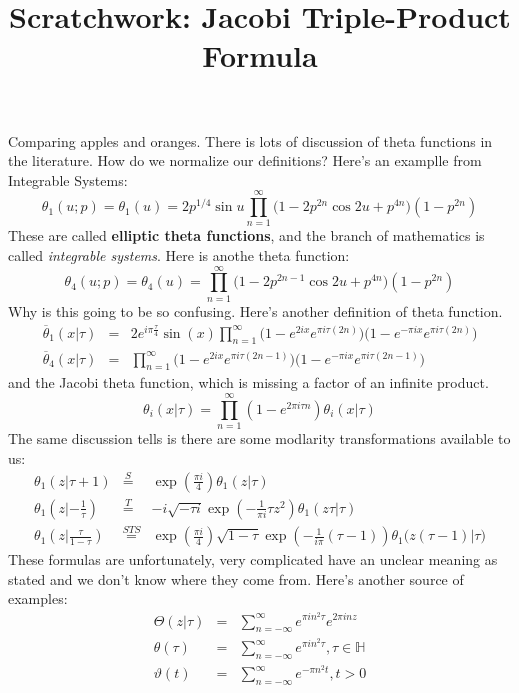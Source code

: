 \documentclass[12pt]{article}
\title{Scratchwork: Jacobi Triple-Product Formula}
\date{}
\begin{document}
\sffamily

\maketitle

\noindent Comparing apples and oranges.  There is lots of discussion of theta functions in the literature.  How do we normalize our definitions?  Here's an examplle from Integrable Systems:
$$ \theta_1(u;p) = \theta_1(u) = 2 p^{1/4} \sin u \prod_{n=1}^\infty 
\big( 1 - 2 p^{2n} \cos 2u + p^{4n} \big)(1 - p^{2n}) $$
These are called \textbf{elliptic theta functions}, and the branch of mathematics is called \textit{integrable systems}.   Here is anothe theta function:
$$ \theta_4(u;p) = \theta_4(u) = \prod_{n=1}^\infty \big( 1 - 2 p^{2n-1} \cos 2u + p^{4n} \big) (1-p^{2n}) $$
Why is this going to be so confusing.  Here's another definition of theta function.
\begin{eqnarray*}
\overline{\theta}_1( x | \tau) &=& 
2 e^{i\pi \frac{\tau}{4}} \sin (x) \prod_{n=1}^\infty \big(1 - e^{2ix} e^{\pi i \tau (2n)}\big)\big(1 - e^{-\pi i x} e^{\pi i \tau (2n)}\big) \\ 
\overline{\theta}_4( x | \tau) &=& \prod_{n=1}^\infty \big(1 - e^{2ix} e^{\pi i \tau (2n -1)}\big)\big(1 - e^{-\pi i x} e^{\pi i \tau (2n -1 )}\big)
\end{eqnarray*} 
and the Jacobi theta function, which is missing a factor of an infinite product.  
$$ \theta_i(x|\tau) = \prod_{n=1}^\infty (1 - e^{2\pi i \tau n }) \theta_i(x|\tau) $$
The same discussion tells is there are some modlarity transformations available to us:
\begin{eqnarray*} 
\theta_1(z|\tau + 1) &\stackrel{S}{=}& \exp \left( \frac{\pi i}{4} \right) \theta_1(z|\tau) \\ 
\theta_1\left(z | - \frac{1}{\tau} \right) &\stackrel{T}{=}& -i \sqrt{- \tau i}\exp\left( - \frac{1}{\pi i} \tau z^2 \right) \theta_1(z\tau | \tau) \\
\theta_1\left(z | \frac{\tau}{1-\tau}\right) &\stackrel{STS}{=}& \exp \left( \frac{\pi i }{4} \right)
\sqrt{1 - \tau}  \exp\left( - \frac{1}{i\pi} (\tau - 1) \right) \theta_1 \big( z(\tau - 1) | \tau \big)  \end{eqnarray*}
These formulas are unfortunately, very complicated have an unclear meaning as stated and we don't know where they come from.   Here's another source of examples:
\begin{eqnarray*}
\Theta(z|\tau) &=& \sum_{n = - \infty}^\infty e^{\pi i n^2 \tau} e^{2\pi i n z} \\
\theta(\tau) &=& \sum_{n=-\infty}^\infty e^{\pi i n^2 \tau}, \tau \in \mathbb{H} \\
\vartheta(t) &=& \sum_{n=-\infty}^\infty e^{-\pi n^2 t}, t > 0
\end{eqnarray*}
\end{document}
